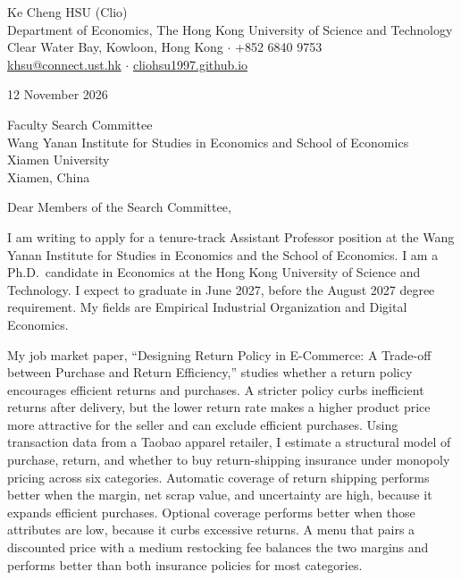\documentclass[11pt]{article}
\begin{document}
\begin{flushleft}
Ke Cheng HSU (Clio) \\
Department of Economics, The Hong Kong University of Science and Technology \\
Clear Water Bay, Kowloon, Hong Kong $\cdot$ +852 6840 9753 \\
\href{mailto:khsu@connect.ust.hk}{khsu@connect.ust.hk} $\cdot$ \href{https://cliohsu1997.github.io/}{cliohsu1997.github.io}
\end{flushleft}

12 November 2026

\vspace{0.1em}
Faculty Search Committee \\
Wang Yanan Institute for Studies in Economics and School of Economics \\
Xiamen University \\
Xiamen, China

\vspace{0.1em}
Dear Members of the Search Committee,

I am writing to apply for a tenure-track Assistant Professor position at the Wang Yanan Institute for Studies in Economics and the School of Economics. I am a Ph.D.\ candidate in Economics at the Hong Kong University of Science and Technology. I expect to graduate in June 2027, before the August 2027 degree requirement. My fields are Empirical Industrial Organization and Digital Economics.

My job market paper, ``Designing Return Policy in E-Commerce: A Trade-off between Purchase and Return Efficiency,'' studies whether a return policy encourages efficient returns and purchases. A stricter policy curbs inefficient returns after delivery, but the lower return rate makes a higher product price more attractive for the seller and can exclude efficient purchases. Using transaction data from a Taobao apparel retailer, I estimate a structural model of purchase, return, and whether to buy return-shipping insurance under monopoly pricing across six categories. Automatic coverage of return shipping performs better when the margin, net scrap value, and uncertainty are high, because it expands efficient purchases. Optional coverage performs better when those attributes are low, because it curbs excessive returns. A menu that pairs a discounted price with a medium restocking fee balances the two margins and performs better than both insurance policies for most categories.
\end{document}
